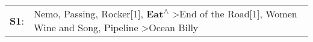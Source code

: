 \begin{supertabular}{p{0.03\textwidth}p{0.92\textwidth}}
 \textbf{S1}:  &  Nemo\textsuperscript{}, \enspace Passing\textsuperscript{}, \enspace Rocker[1]\textsuperscript{}, \enspace \textbf{Eat\textsuperscript{$\wedge$}} \textgreater \enspace End of the Road[1]\textsuperscript{}, \enspace Women Wine and Song\textsuperscript{}, \enspace Pipeline\textsuperscript{} \textgreater \enspace Ocean Billy\textsuperscript{}  \enspace  \\
\end{supertabular}
